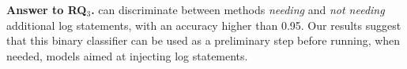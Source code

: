 \vspace{0.2cm}
\begin{resultbox}
\textbf{Answer to RQ$_3$.} \approach can discriminate between methods \emph{needing} and \emph{not needing} additional log statements, with an accuracy higher than 0.95. Our results suggest that this binary classifier can be used as a preliminary step before running, when needed, models aimed at injecting log statements.
\end{resultbox}







